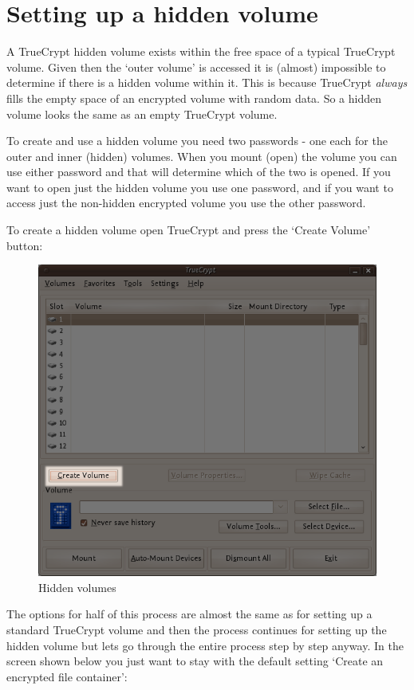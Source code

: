 \section{Setting up a hidden volume}

A TrueCrypt hidden volume exists within the free space of a typical
TrueCrypt volume. Given then the `outer volume' is accessed it is
(almost) impossible to determine if there is a hidden volume within it.
This is because TrueCrypt \emph{always} fills the empty space of an
encrypted volume with random data. So a hidden volume looks the same as
an empty TrueCrypt volume.

To create and use a hidden volume you need two passwords - one each for
the outer and inner (hidden) volumes. When you mount (open) the volume
you can use either password and that will determine which of the two is
opened. If you want to open just the hidden volume you use one password,
and if you want to access just the non-hidden encrypted volume you use
the other password.

To create a hidden volume open TrueCrypt and press the `Create Volume'
button:

\begin{figure}[htbp]
\centering
\includegraphics{hidden_vol_001.png}
\caption{Hidden volumes}
\end{figure}

The options for half of this process are almost the same as for setting
up a standard TrueCrypt volume and then the process continues for
setting up the hidden volume but lets go through the entire process step
by step anyway. In the screen shown below you just want to stay with the
default setting `Create an encrypted file container':

